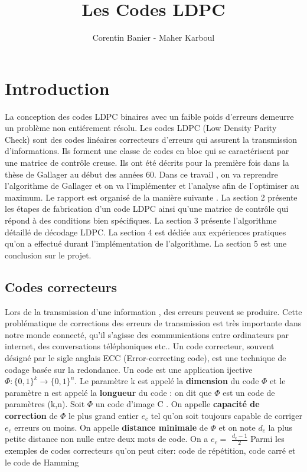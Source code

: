 \documentclass{article}
\title{Les Codes LDPC }
\author{Corentin Banier - Maher Karboul}
\date{}
\begin{document}
\maketitle
\tableofcontents

\section{Introduction}
La conception des codes LDPC binaires avec un faible poids d'erreurs demeurre un problème non entiérement résolu. Les codes LDPC (Low Density Parity Check) sont des codes linéaires correcteurs d'erreurs qui assurent la transmission d'informations. Ils forment une classe de codes en bloc qui se caractérisent par une matrice de contrôle creuse. Ils ont été décrits pour la première fois dans la thèse de Gallager au début des années 60. Dans ce travail , on va reprendre l'algorithme de Gallager et on va l'implémenter et l'analyse afin de l'optimiser au maximum.\newline
Le rapport est organisé de la manière suivante . La section 2 présente les étapes de fabrication d'un code LDPC ainsi qu'une matrice de contrôle qui répond à des conditions bien spécifiques. La section 3 présente l'algorithme détaillé de décodage LDPC. La section 4 est dédiée aux expériences pratiques qu'on a effectué durant l'implémentation de l'algorithme. La section 5 est une conclusion sur le projet.

\subsection{Codes correcteurs}
Lors de la transmission d'une information , des erreurs peuvent se produire. Cette problématique de corrections des erreurs de transmission est très importante dans notre monde connecté, qu'il s'agisse des communications entre ordinateurs par internet, des conversations téléphoniques etc.. \newline
Un code correcteur, souvent désigné par le sigle anglais ECC (Error-correcting code), est une technique de codage basée sur la redondance. \newline
Un code est une application ijective $\Phi:\{0,1\}^k \rightarrow \{0,1\}^n $. \newline
Le paramètre k est appelé la \textbf{dimension} du code $\Phi$ et le paramètre n est appelé la \textbf{longueur} du code : on dit que $\Phi$ est un code de paramètres (k,n). \newline
Soit $\Phi$ un code d'image C . \newline
On appelle \textbf{capacité de correction} de $\Phi$ le plus grand entier $e_c$ tel qu'on soit toujours capable de corriger $e_c$ erreurs ou moins. \newline
On appelle \textbf{distance minimale} de $\Phi$ et on note $d_c$ la plus petite distance non nulle entre deux mots de code. \newline
On a \textbf{$e_c = $} $\frac{d_c-1}{2}$
Parmi les exemples de codes correcteurs qu'on peut citer: code de répétition, code carré et le code de Hamming
\end{document}
